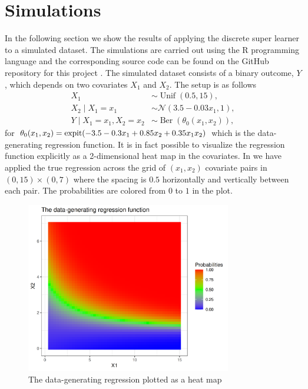 \documentclass[./main.tex]{subfiles}
\begin{document}
\section{Simulations} \label{sec:simulations}
In the following section we show the results of applying the discrete super learner to a simulated dataset. The simulations are carried out using the R programming language and the corresponding source code can be found on the GitHub repository for this project \parencite{github}. The simulated dataset consists of a binary outcome, $Y$, which depends on two covariates $X_1$ and $X_2$. The setup is as follows
\begin{align*}
    X_1 &\sim \operatorname{Unif}(0.5, 15),\\
    X_2 \mid X_1 = x_1 &\sim \mathcal{N}(3.5-0.03x_1, 1),\\
    Y \mid X_1 = x_1, X_2 = x_2 &\sim \operatorname{Ber}(\theta_0(x_1, x_2)),
\end{align*}
for $\theta_0(x_1, x_2) = \operatorname{expit}({-3.5 - 0.3x_1 + 0.85x_2 + 0.35x_1x_2})$ which is the data-generating regression function. It is in fact possible to visualize the regression function explicitly as a 2-dimensional heat map in the covariates. In  we have applied the true regression across the grid of $ (x_1, x_2) $ covariate pairs in $ (0, 15) \times (0,7) $ where the spacing is $ 0.5 $ horizontally and vertically between each pair. The probabilities are colored from $ 0 $ to $ 1 $ in the plot. 
\begin{figure}[H]
    \centering
    \includegraphics[width=0.8\textwidth]{figures/trueplot.png}
    \caption{The data-generating regression plotted as a heat map}
    \label{fig:trueplot}
\end{figure}
\end{document}
